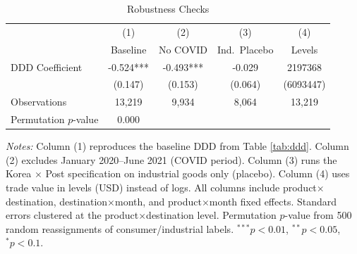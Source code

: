 \begin{table}[htbp]
\centering
\caption{Robustness Checks}
\label{tab:robust}
\begin{threeparttable}
\begin{tabular}{lcccc}
\toprule
 & (1) & (2) & (3) & (4) \\
 & Baseline & No COVID & Ind.\ Placebo & Levels \\
\midrule
DDD Coefficient & -0.524*** & -0.493*** & -0.029 & 2197368 \\
 & (0.147) & (0.153) & (0.064) & (6093447) \\[6pt]
\midrule
Observations & 13,219 & 9,934 & 8,064 & 13,219 \\
Permutation $p$-value & 0.000 & & & \\
\bottomrule
\end{tabular}
\begin{tablenotes}[flushleft]\footnotesize
\item \textit{Notes:} Column (1) reproduces the baseline DDD from Table \ref{tab:ddd}. Column (2) excludes January 2020--June 2021 (COVID period). Column (3) runs the Korea $\times$ Post specification on industrial goods only (placebo). Column (4) uses trade value in levels (USD) instead of logs. All columns include product$\times$destination, destination$\times$month, and product$\times$month fixed effects. Standard errors clustered at the product$\times$destination level. Permutation $p$-value from 500 random reassignments of consumer/industrial labels. $^{***}p<0.01$, $^{**}p<0.05$, $^{*}p<0.1$.
\end{tablenotes}
\end{threeparttable}
\end{table}
